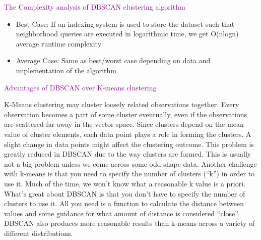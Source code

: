 \textcolor{purple}{The Complexity analysis of DBSCAN clustering algorithm}

\begin{itemize}
    \item Best Case: If an indexing system is used to store the dataset such that
neighborhood queries are executed in logarithmic time, we get O(nlogn) average
runtime complexity
    \item Average Case: Same as best/worst case depending on data and implementation
of the algorithm.
\end{itemize}

\textcolor{purple}{Advantages of DBSCAN over K-means clustering}

K-Means clustering may cluster loosely related observations together. Every
observation becomes a part of some cluster eventually, even if the observations are
scattered far away in the vector space. Since clusters depend on the mean value of
cluster elements, each data point plays a role in forming the clusters. A slight change in
data points might affect the clustering outcome. This problem is greatly reduced in
DBSCAN due to the way clusters are formed. This is usually not a big problem unless
we come across some odd shape data.
Another challenge with k-means is that you need to specify the number of clusters (“k”)
in order to use it. Much of the time, we won’t know what a reasonable k value is a priori.
What’s great about DBSCAN is that you don’t have to specify the number of clusters to
use it. All you need is a function to calculate the distance between values and some
guidance for what amount of distance is considered “close”. DBSCAN also produces
more reasonable results than k-means across a variety of different distributions.